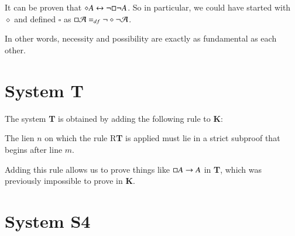 \documentclass[12pt, a4paper, oneside, openright, titlepage]{book}
\begin{document}
\begin{defn}
    \begin{fitchproof}
         
    \end{fitchproof}
    \begin{fitchproof}
         
    \end{fitchproof}
    \begin{fitchproof}
         
    \end{fitchproof}
    \begin{fitchproof}
         
    \end{fitchproof}
\end{defn}

It can be proven that $\diamond A \leftrightarrow \neg\square\neg A$. So in particular, we could have started with $\diamond$ and defined $\square$ as $\square \mathcal{A} =_{df} \neg\diamond\neg \mathcal{A}$.

In other words, necessity and possibility are exactly as fundamental as each other.


\section{\textsection System \textbf{T}}

The system \textbf{T} is obtained by adding the following rule to \textbf{K}:

\begin{defn}
    \begin{fitchproof}
         
    \end{fitchproof}
    The lien $n$ on which the rule R\textbf{T} is applied must  lie in a strict subproof that begins after line $m$.
\end{defn}

Adding this rule allows us to prove things like $\square A \rightarrow A$ in \textbf{T}, which was previously impossible to prove in \textbf{K}.


\section{System \textbf{S4}}
\end{document}
